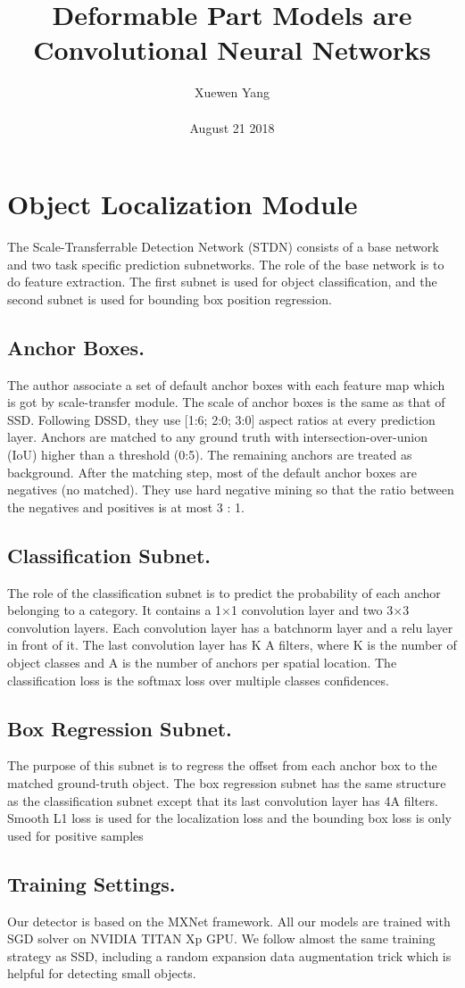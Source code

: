 \documentclass[10pt,twocolumn,letterpaper]{article}
\author{Xuewen Yang\\\\
August 21 2018}
\title{Deformable Part Models are Convolutional Neural Networks}
\begin{document}
\maketitle
\section{Object Localization Module}
The Scale-Transferrable Detection Network (STDN)
consists of a base network and two task specific prediction
subnetworks. The role of the base network is to do feature extraction. The first subnet is used for object classification,
and the second subnet is used for bounding box position
regression.
\subsection{Anchor Boxes.}
The author associate a set of default anchor boxes with each feature
map which is got by scale-transfer module. The scale
of anchor boxes is the same as that of SSD\cite{Liu2015SSD}. Following
DSSD, they use [1:6; 2:0; 3:0] aspect ratios at every prediction
layer. Anchors are matched to any ground truth with
intersection-over-union (IoU) higher than a threshold (0:5).
The remaining anchors are treated as background. After the
matching step, most of the default anchor boxes are negatives
(no matched). They use hard negative mining so that the
ratio between the negatives and positives is at most 3 : 1.
\subsection{Classification Subnet.}
The role of the classification subnet is to predict the probability
of each anchor belonging to a category. It contains
a 1$\times$1 convolution layer and two 3$\times$3 convolution layers.
Each convolution layer has a batchnorm layer\cite{Ioffe2015Batch} and
a relu layer in front of it. The last convolution layer has K A
filters, where K is the number of object classes and A is the
number of anchors per spatial location. The classification
loss is the softmax loss over multiple classes confidences.
\subsection{Box Regression Subnet.}
The purpose of this subnet is to regress the offset from each
anchor box to the matched ground-truth object. The box
regression subnet has the same structure as the classification
subnet except that its last convolution layer has 4A filters.
Smooth L1 loss is used for the localization loss and the
bounding box loss is only used for positive samples
\subsection{Training Settings.}
Our detector is based on the MXNet\cite{Gidaris2015Object} framework. All our
models are trained with SGD solver on NVIDIA TITAN Xp
GPU. We follow almost the same training strategy as SSD\cite{Liu2015SSD}, including a random expansion data augmentation trick
which is helpful for detecting small objects.

{\small


}
\end{document}
